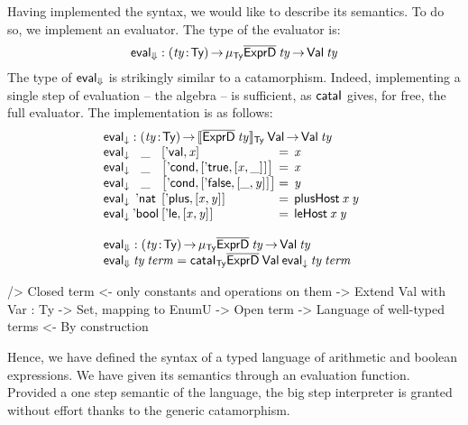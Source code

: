 Having implemented the syntax, we would like to describe its
semantics. To do so, we implement an evaluator. The type of the
evaluator is:
%
\[
\evalH : \PI{\V{ty}}{\Ty} 
         \IMu{\Ty}{\toIDesc{\HExprD}}{\V{ty}} \To
         \Val{\V{ty}}
\]
%
The type of $\evalH$ is strikingly similar to a
catamorphism. Indeed, implementing a single step of evaluation -- the
algebra -- is sufficient, as $\cataI$ gives, for free, the full
evaluator. The implementation is as follows:
%
\[\stk{
\evalOne : \PI{\V{ty}}{\Ty} \idescop{\toIDesc{\HExprD}\:\V{ty}}{\Ty}{\SYMBVal}
           \To {\Val{\V{ty}}} \\
\begin{array}{@{}l@{}c@{}l@{\:=\:\:}l}
\evalOne\: & \_\: & \pair{\SYMBEval}{\V{x}}{}                                             & \V{x} \\
\evalOne\: & \_\: & \pair{\SYMBEcond}{\pair{\BoolTrue}{\pair{\V{x}}{\_}{}}{}}{}   & \V{x} \\
\evalOne\: & \_\: & \pair{\SYMBEcond}{\pair{\BoolFalse}{\pair{\_}{\V{y}}{}}{}}{}  & \V{y} \\
\evalOne\: & \Enat\: & \pair{\SYMBEplus}{\pair{\V{x}}{\V{y}}{}}{}                     & \F{plusHost}\: \V{x}\: \V{y} \\
\evalOne\: & \Ebool\: & \pair{\SYMBEle}{\pair{\V{x}}{\V{y}}{}}{}                      & \F{leHost}\: \V{x}\: \V{y} 
\end{array} \\
\\
\evalH : \PI{\V{ty}}{\Ty} 
           \IMu{\Ty}{\toIDesc{\HExprD}}{\V{ty}} \To
           \Val{\V{ty}} \\
\evalH\: \V{ty}\: \V{term} = \cataI_{\Ty}
                                 \toIDesc{\HExprD}\: 
                                 \SYMBVal\: 
                                 \evalOne\: 
                                 \V{ty}\: 
                                 \V{term}
}\]

\begin{wstructure}
    /> Closed term
        <- only constants and operations on them
        -> Extend Val with Var : Ty -> Set, mapping to EnumU
            -> Open term
            -> Language of well-typed terms
                <- By construction
\end{wstructure}

Hence, we have defined the syntax of a typed language of arithmetic
and boolean expressions. We have given its semantics through an
evaluation function. Provided a one step semantic of the language, the
big step interpreter is granted without effort thanks to the generic
catamorphism.

